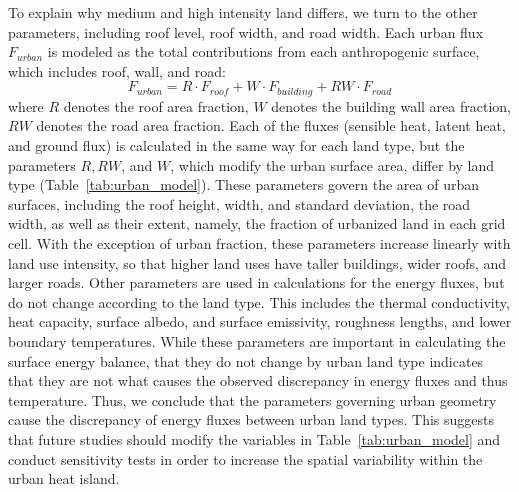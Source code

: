 \documentclass[draft,linenumbers]{agujournal}
\begin{document}
To explain why medium and high intensity land differs, we turn to the other parameters, including roof level, roof width, and road width. 
Each urban flux $F_{urban}$ is modeled as the total contributions from each anthropogenic surface, which includes roof, wall, and road: 
\[ F_{urban} = R\cdot F_{roof} + W\cdot F_{building} + RW\cdot F_{road} \]
where $R$ denotes the roof area fraction, $W$ denotes the building wall area fraction, $RW$ denotes the road area fraction.
Each of the fluxes (sensible heat, latent heat, and ground flux) is calculated in the same way for each land type, but the parameters $R, RW$, and $W$, which modify the urban surface area, differ by land type (Table~\ref{tab:urban_model}). 
These parameters govern the area of urban surfaces, including the roof height, width, and standard deviation, the road width, as well as their extent, namely, the fraction of urbanized land in each grid cell. 
With the exception of urban fraction, these parameters increase linearly with land use intensity, so that higher land uses have taller buildings, wider roofs, and larger roads. 
Other parameters are used in calculations for the energy fluxes, but do not change according to the land type. This includes the thermal conductivity, heat capacity, surface albedo, and surface emissivity, roughness lengths, and lower boundary temperatures. While these parameters are important in calculating the surface energy balance, that they do not change by urban land type indicates that they are not what causes the observed discrepancy in energy fluxes and thus temperature. 
Thus, we conclude that the parameters governing urban geometry cause the discrepancy of energy fluxes between urban land types. 
This suggests that future studies should modify the variables in Table~\ref{tab:urban_model} and conduct sensitivity tests in order to increase the spatial variability within the urban heat island.
 
\end{document}
